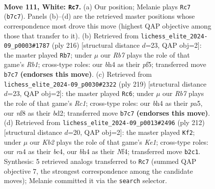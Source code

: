 \documentclass[11pt]{article}
\begin{document}
\clearpage

\begin{figure}[p]\centering
\begin{subfigure}{0.46\textwidth}\centering
\resizebox{\linewidth}{!}{%
\newchessgame
\chessboard[
  setfen={5n2/1R6/7p/4p3/r5kb/3p4/1K6/8 w - - 18 111},
  showmover=false,
  pgfstyle=straightmove, color=movearrow, markmove={b7-c7}
]}
\caption{}
\end{subfigure}\hfill
\begin{subfigure}{0.46\textwidth}\centering
\resizebox{\linewidth}{!}{%
\newchessgame
\chessboard[
  setfen={8/8/4r3/5p2/8/5pk1/8/1R3K2 w - - 74 109},
  showmover=false,
  pgfstyle=straightmove, color=movearrow, markmove={b1-b7}
]}
\caption{}
\end{subfigure}
\\[4pt]
\begin{subfigure}{0.46\textwidth}\centering
\resizebox{\linewidth}{!}{%
\newchessgame
\chessboard[
  setfen={2r1k3/7R/8/P3K3/8/8/3Bb3/8 b - - 70 110},
  showmover=false,
  pgfstyle=straightmove, color=movearrow, markmove={c8-c6}
]}
\caption{}
\end{subfigure}\hfill
\begin{subfigure}{0.46\textwidth}\centering
\resizebox{\linewidth}{!}{%
\newchessgame
\chessboard[
  setfen={r7/8/8/2k5/2b1pN2/4P3/8/1R2K3 w - - 76 107},
  showmover=false,
  pgfstyle=straightmove, color=movearrow, markmove={e1-f2}
]}
\caption{}
\end{subfigure}
\caption{\textbf{Move 111, White: \texttt{Rc7}.} (a) Our position; Melanie plays \texttt{Rc7} (\texttt{b7c7}). Panels (b)--(d) are the retrieved master positions whose correspondence most drove this move (highest QAP objective among those that transfer to it). (b) Retrieved from \texttt{lichess\_elite\_2024-09\_p0003\#1787} (ply 216) [structural distance $d$=23, QAP obj=2]: the master played \texttt{Rb7}; under $\mu$ our \emph{Rb7} plays the role of that game's \emph{Rb1}; cross-type roles: our \emph{b}h4 as their \emph{p}f5; transferred move \texttt{b7c7} \textbf{(endorses this move)}. (c) Retrieved from \texttt{lichess\_elite\_2024-09\_p0030\#2322} (ply 219) [structural distance $d$=23, QAP obj=2]: the master played \texttt{Rc6}; under $\mu$ our \emph{Rb7} plays the role of that game's \emph{Rc1}; cross-type roles: our \emph{b}h4 as their \emph{p}a5, our \emph{n}f8 as their \emph{b}d2; transferred move \texttt{b7c7} \textbf{(endorses this move)}. (d) Retrieved from \texttt{lichess\_elite\_2024-09\_p0013\#2496} (ply 212) [structural distance $d$=20, QAP obj=2]: the master played \texttt{Kf2}; under $\mu$ our \emph{Kb2} plays the role of that game's \emph{Ke1}; cross-type roles: our \emph{r}a4 as their \emph{b}c4, our \emph{b}h4 as their \emph{N}f4; transferred move \texttt{b2c1}. Synthesis: 5 retrieved analogs transferred to \texttt{Rc7} (summed QAP objective 7, the strongest correspondence among the candidate moves); Melanie committed it via the \texttt{search} selector.}
\label{fig:thought-m220}
\end{figure}
\end{document}
